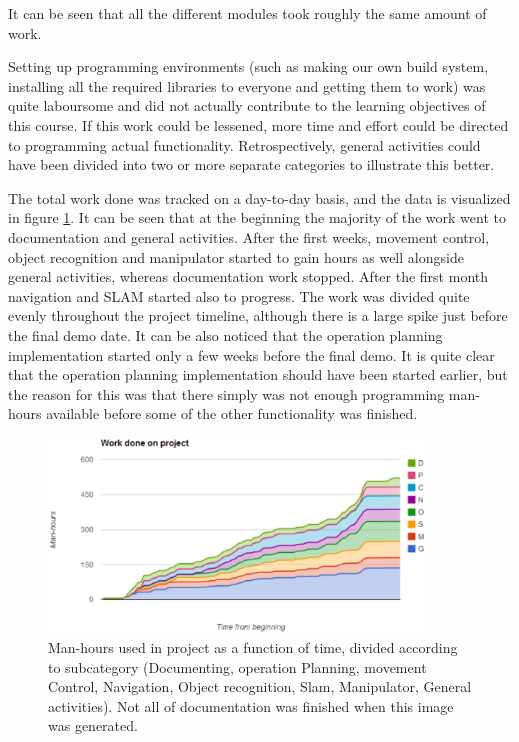 \documentclass[a4paper,10pt]{article}
\begin{document}
It can be seen that all the different modules took roughly the same amount of work. 


Setting up programming environments (such as making our own build system, installing all the required libraries to everyone and getting them to work) was quite laboursome and did not actually contribute to the learning objectives of this course. If this work could be lessened, more time and effort could be directed to programming actual functionality. Retrospectively, general activities could have been divided into two or more separate categories to illustrate this better.


The total work done was tracked on a day-to-day basis, and the data is visualized in figure \ref{man_hours}. It can be seen that at the beginning the majority of the work went to documentation and general activities. After the first weeks, movement control, object recognition and manipulator started to gain hours as well alongside general activities, whereas documentation work stopped. After the first month navigation and SLAM started also to progress. The work was divided quite evenly throughout the project timeline, although there is a large spike just before the final demo date. It can be also noticed that the operation planning implementation started only a few weeks before the final demo. It is quite clear that the operation planning implementation should have been started earlier, but the reason for this was that there simply was not enough programming man-hours available before some of the other functionality was finished.

\begin{figure}[h]	%
\begin{center}
\includegraphics[width=10.0cm]{man_hours.eps}
\caption{Man-hours used in project as a function of time, divided according to subcategory (Documenting, operation Planning, movement Control, Navigation, Object recognition, Slam, Manipulator, General activities). Not all of documentation was finished when this image was generated.}
\label{man_hours} %
\end{center}
\end{figure}
\end{document}
